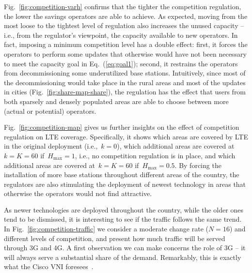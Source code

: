\documentclass[10pt,journal,cspaper,compsoc]{IEEEtran}
\newcommand{\Fig}[1]{Fig.~\ref{fig:#1}}
\newcommand{\Eq}[1]{Eq.~(\ref{eq:#1})}
\begin{document}
\Fig{competition-varh} confirms that the tighter the competition regulation,
the lower the savings operators are able to achieve.
As expected, moving from the most loose to the tightest level of regulation
also increases the unused capacity -- i.e., from the regulator's viewpoint, the capacity
available to new operators.
In fact, imposing a minimum competition level has a double effect:
first, it forces the operators to perform 
some updates that otherwise would have not been necessary to meet the capacity goal in \Eq{goal1};
second, it restrains the operators from decommissioning some underutilized base stations.
Intuitively, since most of the decommissioning would take place in the rural areas and most of the updates
in cities (\Fig{share-map-share}), the regulation has the effect that
users from both sparsely and densely populated areas
are able to choose between more (actual or potential) operators.

\begin{figure*}[t]
\centering
{}
\caption{
Unused capacity and cost (as defined in \Eq{goal3})
as a function of HHI index and for different values of~$N$ (a);
LTE coverage at~$k=0$ (orange),~$k=K=60$ when~$H_{\max}=1$ (light green),
and at~$k=K=60$ when~$H_{\max}=0.5$ (dark green).
\label{fig:competition}
}
\end{figure*}

\Fig{competition-map} gives us further insights on the effect of
competition regulation on LTE coverage.
Specifically, it shows which areas are covered by LTE in the original deployment (i.e.,~$k=0$),
which additional areas are covered at~$k=K=60$ if~$H_{\max}=1$, i.e., no competition regulation
is in place, and which additional areas are covered at~$k=K=60$ if~$H_{\max}=0.5$.
By forcing the installation of more base stations throughout
different areas of the country,
the regulators are also stimulating the deployment of newest technology in areas that otherwise
the operators would not find attractive.

As newer technologies are deployed throughout the country, while the older ones tend to be dismissed,
it is interesting to see if the traffic follows the same trend.
In \Fig{competition-traffic} we consider a moderate change rate ($N=16$) and different levels of competition,
and present how much traffic will be served through 3G and 4G. A first observation we can
make concerns the role of 3G -- it will always serve a substantial share of the demand.
Remarkably, this is exactly what the Cisco VNI foresees~\cite{cisco}.
\end{document}

